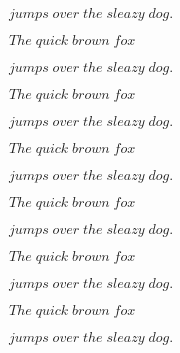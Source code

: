 \documentclass{worksheet}
\begin{document}
\begin{drillsheet}
$jumps\;over\;the\;sleazy\;dog.$

$The\;quick\;brown\;fox$

$jumps\;over\;the\;sleazy\;dog.$

$The\;quick\;brown\;fox$

$jumps\;over\;the\;sleazy\;dog.$

$The\;quick\;brown\;fox$

$jumps\;over\;the\;sleazy\;dog.$

$The\;quick\;brown\;fox$

$jumps\;over\;the\;sleazy\;dog.$

$The\;quick\;brown\;fox$

$jumps\;over\;the\;sleazy\;dog.$

$The\;quick\;brown\;fox$

$jumps\;over\;the\;sleazy\;dog.$
\end{drillsheet}
\end{document}
